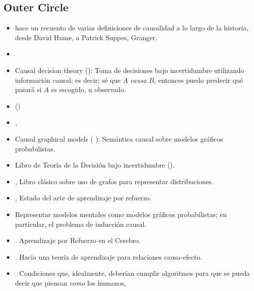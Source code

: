 \documentclass[11pt]{article}
\theoremstyle{plain}
\begin{document}
\subsection{Outer Circle}
\begin{itemize}
\item \cite{holland1986statistics} hace un recuento de varias definiciones de causalidad a lo largo de la historia, desde David Hume, a Patrick Suppes, Granger.
\item \cite{sutton1998reinforcement}
\item Causal decision theory (\cite{joyce1999foundations}): Toma de decisiones bajo incertidumbre utilizando información causal; es decir; sé que $A$ \textit{causa} $B$, entonces puedo predecir qué pasará si $A$ es escogido, u observado.
\item (\cite{spirtes2000causation})
\item \cite{pearl2009causality},
\item Causal graphical models ( \cite{koller2009probabilistic}): Semántica causal sobre modelos gráficos probabilistas.
\item Libro de Teoría de la Decisión bajo incertidumbre (\cite{gilboa2009decision}).
\item \cite{pearl1988probabilistic}, Libro clásico sobre uso de grafos para representar distribuciones.
\item \cite{van2012reinforcement}, Estado del arte de aprendizaje por refuerzo.
\item  \cite{danks2014unifying} Representar modelos mentales como modelos gráficos probabilistas; en particular, el problema de inducción causal. 
\item \cite{gershman2015reinforcement}. Aprendizaje por Refuerzo en el Cerebro.
\item \cite{lopez2015towards}. Hacia una teoría de aprendizaje para relaciones causa-efecto.
\item \cite{lake2017building}. Condiciones que, idealmente, deberían cumplir algoritmos para que se pueda decir que piensan \textit{como} los humanos,
\end{itemize}
\end{document}
